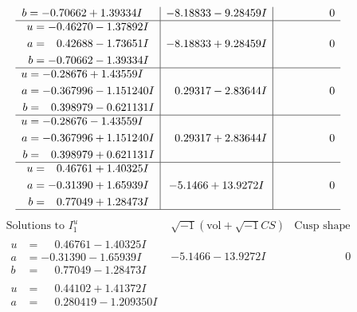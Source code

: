 \documentclass[1p]{elsarticle_modified}
\theoremstyle{definition}
\newcommand{\I}{\sqrt{-1}}
\begin{document}
$$\begin{array}{c|c|c}
\begin{aligned}
b &= -0.70662 + 1.39334 I\end{aligned}
 & -8.18833 - 9.28459 I & \phantom{-0.000000 } 0 \\ \hline\begin{aligned}
u &= -0.46270 - 1.37892 I \\
a &= \phantom{-}0.42688 - 1.73651 I \\
b &= -0.70662 - 1.39334 I\end{aligned}
 & -8.18833 + 9.28459 I & \phantom{-0.000000 } 0 \\ \hline\begin{aligned}
u &= -0.28676 + 1.43559 I \\
a &= -0.367996 - 1.151240 I \\
b &= \phantom{-}0.398979 - 0.621131 I\end{aligned}
 & \phantom{-}0.29317 - 2.83644 I & \phantom{-0.000000 } 0 \\ \hline\begin{aligned}
u &= -0.28676 - 1.43559 I \\
a &= -0.367996 + 1.151240 I \\
b &= \phantom{-}0.398979 + 0.621131 I\end{aligned}
 & \phantom{-}0.29317 + 2.83644 I & \phantom{-0.000000 } 0 \\ \hline\begin{aligned}
u &= \phantom{-}0.46761 + 1.40325 I \\
a &= -0.31390 + 1.65939 I \\
b &= \phantom{-}0.77049 + 1.28473 I\end{aligned}
 & -5.1466 + 13.9272 I & \phantom{-0.000000 } 0\\
 \hline 
 \end{array}$$\newpage$$\begin{array}{c|c|c}  
\text{Solutions to }I^u_{1}& \I (\text{vol} + \sqrt{-1}CS) & \text{Cusp shape}\\
 \hline 
\begin{aligned}
u &= \phantom{-}0.46761 - 1.40325 I \\
a &= -0.31390 - 1.65939 I \\
b &= \phantom{-}0.77049 - 1.28473 I\end{aligned}
 & -5.1466 - 13.9272 I & \phantom{-0.000000 } 0 \\ \hline\begin{aligned}
u &= \phantom{-}0.44102 + 1.41372 I \\
a &= \phantom{-}0.280419 - 1.209350 I \\

\end{aligned}
\end{array}$$
\end{document}
